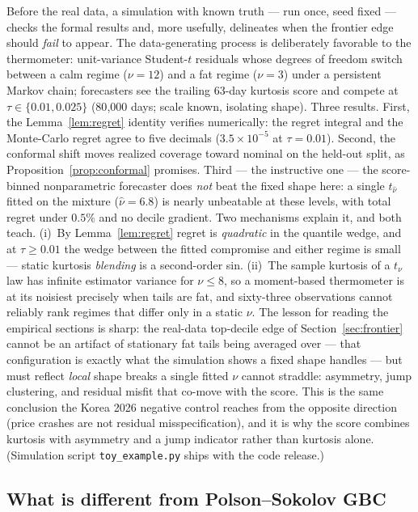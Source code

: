 \documentclass[11pt]{article}
\theoremstyle{remark}
\begin{document}
Before the real data, a simulation with known truth --- run once, seed
fixed --- checks the formal results and, more usefully, delineates when
the frontier edge should \emph{fail} to appear. The data-generating
process is deliberately favorable to the thermometer: unit-variance
Student-$t$ residuals whose degrees of freedom switch between a calm
regime ($\nu=12$) and a fat regime ($\nu=3$) under a persistent Markov
chain; forecasters see the trailing 63-day kurtosis score and compete
at $\tau \in \{0.01, 0.025\}$ (80{,}000 days; scale known, isolating
shape). Three results. First, the Lemma~\ref{lem:regret} identity
verifies numerically: the regret integral and the Monte-Carlo regret
agree to five decimals ($3.5\times10^{-5}$ at $\tau=0.01$). Second, the
conformal shift moves realized coverage toward nominal on the held-out
split, as Proposition~\ref{prop:conformal} promises. Third --- the
instructive one --- the score-binned nonparametric forecaster does
\emph{not} beat the fixed shape here: a single $t_{\widehat\nu}$
fitted on the mixture ($\widehat\nu = 6.8$) is nearly unbeatable at
these levels, with total regret under $0.5\%$ and no decile gradient.
Two mechanisms explain it, and both teach. (i)~By
Lemma~\ref{lem:regret} regret is \emph{quadratic} in the quantile
wedge, and at $\tau \ge 0.01$ the wedge between the fitted compromise
and either regime is small --- static kurtosis \emph{blending} is a
second-order sin. (ii)~The sample kurtosis of a $t_\nu$ law has
infinite estimator variance for $\nu \le 8$, so a moment-based
thermometer is at its noisiest precisely when tails are fat, and
sixty-three observations cannot reliably rank regimes that differ only
in a static $\nu$. The lesson for reading the empirical sections is
sharp: the real-data top-decile edge of Section~\ref{sec:frontier}
cannot be an artifact of stationary fat tails being averaged over ---
that configuration is exactly what the simulation shows a fixed shape
handles --- but must reflect \emph{local} shape breaks a single fitted
$\nu$ cannot straddle: asymmetry, jump clustering, and residual misfit
that co-move with the score. This is the same conclusion the Korea 2026
negative control reaches from the opposite direction (price crashes
are not residual misspecification), and it is why the score combines
kurtosis with asymmetry and a jump indicator rather than kurtosis
alone. (Simulation script \texttt{toy\_example.py} ships with the code
release.)

\subsection{What is different from Polson--Sokolov GBC}\label{sec:polsondelta}
\end{document}

